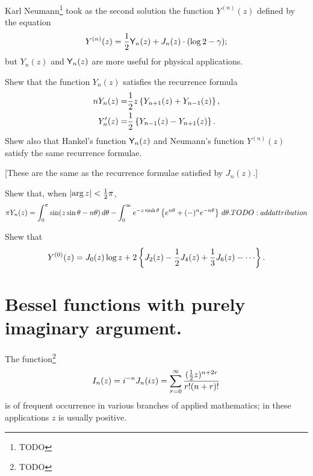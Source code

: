 \documentclass{book}
\begin{document}
  Karl Neumann\footnote{TODO} took as the second solution the function
  $Y^{(n)}(z)$ defined by the equation
  $$
  Y^{(n)}(z)
  =
  \frac{1}{2} \mathsf{Y}_n(z) + J_n(z) \cdot (\log 2 - \gamma);
  $$
  but $Y_n(z)$ and $\mathsf{Y}_n(z)$ are more useful for physical
  applications.
  \begin{wandwexample}
    Shew that the function $Y_n(z)$ satisfies the recurrence formula
    \begin{align*}
      n Y_n(z)
      =& \frac{1}{2} z \left\{  Y_{n+1}(z) + Y_{n-1}(z) \right\},
      \\
      Y_n'(z)
      =& \frac{1}{2} \left\{  Y_{n-1}(z) - Y_{n+1}(z)   \right\}.
    \end{align*}
    Shew also that Hankel's function $\mathsf{Y}_n(z)$ and Neumann's
    function $Y^{(n)}(z)$ satisfy the same recurrence formulae.

    [These are the same as the recurrence formulae satisfied by $J_n(z)$.]
  \end{wandwexample}
  \begin{wandwexample}
    Shew that, when $\left| \arg z \right| < \frac{1}{2} \pi$,
    $$
    \pi Y_n(z)
    =
    \int_0^{\pi}
    \sin (z \sin\theta - n\theta) \, d \theta
    -
    \int_0^{\infty}
    e^{-z \sinh\theta} \left\{ e^{n\theta} + (-)^n e^{-n\theta} \right\} \, d\theta.
    TODO:addattribution
    $$
  \end{wandwexample}
  \begin{wandwexample}
    Shew that
    $$
    Y^{(0)}(z)
    =
    J_0(z) \log z
    + 2 \thebrace{ J_2(z) - \half J_4(z) + \frac{1}{3} J_6(z) - \cdots  }.
    $$
  \end{wandwexample}

\section{Bessel functions with purely imaginary argument.}
The function\footnote{TODO}
$$
I_n(z)
=
i^{-n}
J_n(iz)
=
\sum_{r=0}^{\infty}
  \frac{(\frac{1}{2} z)^{n+2r}}{r!(n+r)!}
  $$
  is of frequent occurrence in various branches of applied
  mathematics; in these applications $z$ is usually positive.
\end{document}
